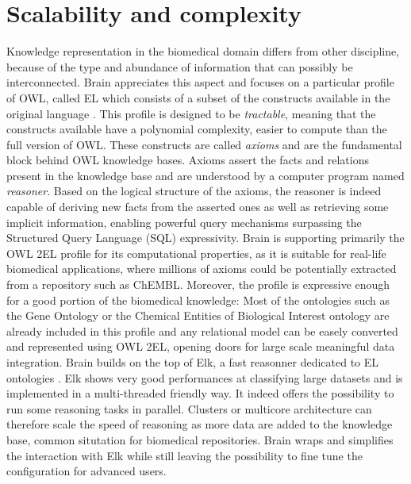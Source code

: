 \documentclass{bioinfo}
\begin{document}
\section{Scalability and complexity}
Knowledge representation in the biomedical domain differs from other discipline, because of the type and abundance of
information that can possibly be interconnected. Brain appreciates this aspect and focuses on a particular profile of OWL, called EL
which consists of a subset of the constructs available in the original language \citep{Motik2009}. This profile is
designed to be \emph{tractable}, meaning that the constructs available have a polynomial complexity, easier to compute than the full 
version of OWL. 
These constructs are called \emph{axioms} and are the fundamental block behind OWL knowledge bases.
Axioms assert the facts and relations present in the knowledge base and are understood by a computer program named \emph{reasoner}. 
Based on the logical structure of the axioms, the reasoner is indeed capable of deriving new facts from the asserted ones as well as retrieving
some implicit information, enabling powerful query mechanisms surpassing the Structured Query Language (SQL) expressivity. 
Brain is supporting primarily the OWL 2EL profile for its computational properties, as it is suitable for real-life biomedical applications, 
where millions of axioms could be potentially extracted from a repository such as ChEMBL.
Moreover, the profile is expressive enough for a good portion of the biomedical knowledge: Most of the ontologies such as the Gene Ontology or 
the Chemical Entities of Biological Interest ontology are already included in this profile and any relational model can be easely 
converted and represented using OWL 2EL, opening doors for large scale meaningful data integration.
Brain builds on the top of Elk, a fast reasonner dedicated to EL ontologies \citep{YevgenyKazakov2011}. Elk shows very good 
performances at classifying 
large datasets and is implemented in a multi-threaded friendly way. It indeed offers the possibility to run some reasoning tasks in parallel.
Clusters or multicore architecture can therefore scale the speed of reasoning as more data are added to the knowledge base, common
situtation for biomedical repositories. Brain wraps and simplifies the interaction with Elk while still leaving the possibility to fine tune 
the configuration for advanced users.
\end{document}
